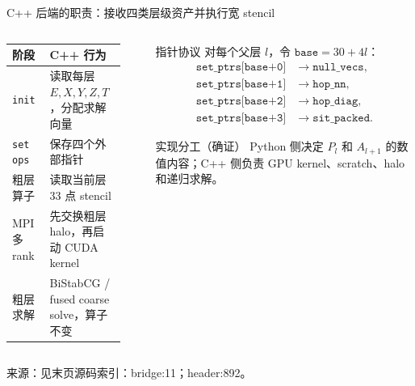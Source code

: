 \documentclass[UTF8,aspectratio=169,11pt]{ctexbeamer}
\newcommand{\source}[1]{%
  \vspace{-0.08em}\par{\raggedright\scriptsize\color{muted}来源：#1\par}}
\newcommand{\src}[1]{\nolinkurl{#1}}
\newcommand{\verified}{\textcolor{evidence}{确证}}
\begin{document}
\begin{frame}[t]{C++ 后端的职责：接收四类层级资产并执行宽 stencil}
  \begin{columns}[T,totalwidth=\textwidth]
    \begin{column}{0.49\textwidth}
      \begin{tabular}{@{}P{0.30\linewidth}P{0.56\linewidth}@{}}
        \toprule
        阶段 & C++ 行为 \\
        \midrule
        \src{init} & 读取每层 $E,X,Y,Z,T$，分配求解向量 \\
        \src{set ops} & 保存四个外部指针 \\
        粗层算子 & 读取当前层 33 点 stencil \\
        MPI 多 rank & 先交换粗层 halo，再启动 CUDA kernel \\
        粗层求解 & BiStabCG / fused coarse solve，算子不变 \\
        \bottomrule
      \end{tabular}
    \end{column}
    \begin{column}{0.47\textwidth}
      \begin{block}{指针协议}
        \footnotesize
        对每个父层 $l$，令 $\texttt{base}=30+4l$：
        \begin{align*}
          \texttt{set\_ptrs[base+0]}&\to\texttt{null\_vecs},\\
          \texttt{set\_ptrs[base+1]}&\to\texttt{hop\_nn},\\
          \texttt{set\_ptrs[base+2]}&\to\texttt{hop\_diag},\\
          \texttt{set\_ptrs[base+3]}&\to\texttt{sit\_packed}.
        \end{align*}
      \end{block}
      \begin{block}{实现分工（\verified）}
        \footnotesize
        Python 侧决定 $P_l$ 和 $A_{l+1}$ 的数值内容；C++ 侧负责 GPU kernel、scratch、halo 和递归求解。
      \end{block}
    \end{column}
  \end{columns}
  \source{见末页源码索引：bridge:11；header:892。}
\end{frame}
\end{document}
